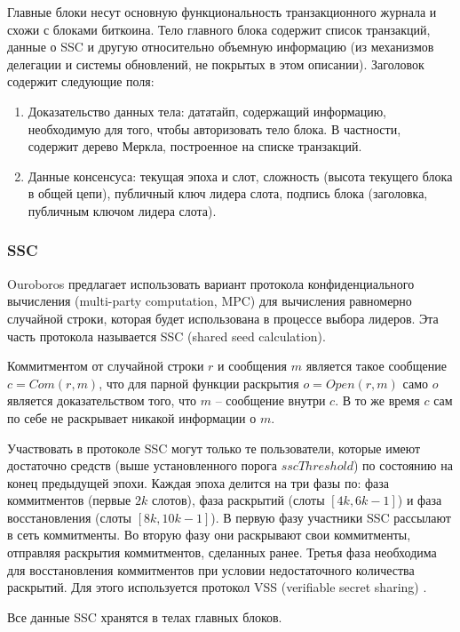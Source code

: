 \documentclass[specification,annotation]{itmo-student-thesis}
\begin{document}
Главные блоки несут основную функциональность транзакционного журнала
и схожи с блоками биткоина. Тело главного блока содержит список
транзакций, данные о SSC и другую относительно объемную информацию (из
механизмов делегации и системы обновлений, не покрытых в этом
описании). Заголовок содержит следующие поля:

\begin{enumerate}
\item Доказательство данных тела: дататайп, содержащий информацию,
  необходимую для того, чтобы авторизовать тело блока. В частности,
  содержит дерево Меркла, построенное на списке транзакций.
\item Данные консенсуса: текущая эпоха и слот, сложность (высота
  текущего блока в общей цепи), публичный ключ лидера слота, подпись
  блока (заголовка, публичным ключом лидера слота).
\end{enumerate}

\subsubsection{SSC}

Ouroboros предлагает использовать вариант протокола конфиденциального
вычисления (multi-party computation, MPC) для вычисления равномерно
случайной строки, которая будет использована в процессе выбора
лидеров. Эта часть протокола называется SSC (shared seed calculation).

Коммитментом от случайной строки $r$ и сообщения $m$ является такое
сообщение $c = Com(r,m)$, что для парной функции раскрытия $o =
Open(r,m)$ само $o$ является доказательством того, что $m$ --
сообщение внутри $c$. В то же время $c$ сам по себе не раскрывает
никакой информации о $m$.

Участвовать в протоколе SSC могут только те пользователи, которые
имеют достаточно средств (выше установленного порога $sscThreshold$)
по состоянию на конец предыдущей эпохи. Каждая эпоха делится на три
фазы по: фаза коммитментов (первые $2k$ слотов), фаза раскрытий (слоты
$[4k, 6k-1]$) и фаза восстановления (слоты $[8k, 10k-1]$). В
первую фазу участники SSC рассылают в сеть коммитменты. Во вторую фазу
они раскрывают свои коммитменты, отправляя раскрытия коммитментов,
сделанных ранее. Третья фаза необходима для восстановления
коммитментов при условии недостаточного количества раскрытий. Для
этого используется протокол VSS (verifiable secret sharing)
\cite{feldman1987practical}.

Все данные SSC хранятся в телах главных блоков.
\end{document}
